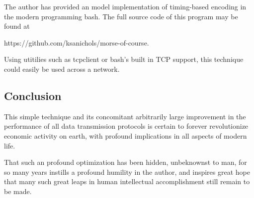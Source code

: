 \documentclass[sigplan]{acmart}
\begin{document}
The author has provided an model implementation
of timing-based encoding in the modern programming
bash. The full source code of this program may be
found at

https://github.com/ksanichols/morse-of-course.

Using utitilies such as tcpclient or bash's built in TCP support,
this technique could easily be used across a network.

\subsection{Conclusion}

This simple technique and its concomitant arbitrarily large improvement
in the performance of all data transmission protocols is certain to
forever revolutionize economic activity on earth, with profound
implications in all aspects of modern life.

That such an profound optimization has been hidden, unbeknownst
to man, for so many years instills a profound humility in the author,
and inspires great hope that many such great leaps in human
intellectual accomplishment still remain to be made.



\end{document}
